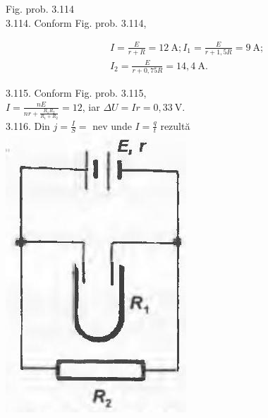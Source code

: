 \documentclass[10pt]{article}
\begin{document}
Fig. prob. 3.114\\
3.114. Conform Fig. prob. 3.114,

$$
\begin{aligned}
& I=\frac{E}{r+R}=12 \mathrm{~A} ; I_{1}=\frac{E}{r+1,5 R}=9 \mathrm{~A} ; \\
& I_{2}=\frac{E}{r+0,75 R}=14,4 \mathrm{~A} .
\end{aligned}
$$

3.115. Conform Fig. prob. 3.115,\\
$I=\frac{n E}{n r+\frac{R_{1} R_{2}}{R_{1}+R_{2}}}=12$, iar $\Delta U=I r=0,33 \mathrm{~V}$.\\
3.116. Din $j=\frac{I}{S}=$ nev unde $I=\frac{q}{t}$ rezultă\\
\includegraphics[max width=\textwidth, center]{2025_07_01_5b3ff9fa0d508c8e9f17g-364}
\end{document}
